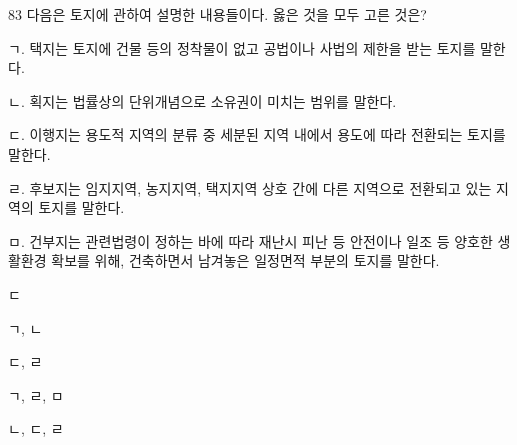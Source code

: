 \begin{question}{83}
다음은 토지에 관하여 설명한 내용들이다. 옳은 것을 모두 고른 것은?
\begin{framedtext}
ㄱ. 택지는 토지에 건물 등의 정착물이 없고 공법이나 사법의 제한을 받는 토지를 말한다. \par
ㄴ. 획지는 법률상의 단위개념으로 소유권이 미치는 범위를 말한다. \par
ㄷ. 이행지는 용도적 지역의 분류 중 세분된 지역 내에서 용도에 따라 전환되는 토지를 말한다. \par
ㄹ. 후보지는 임지지역, 농지지역, 택지지역 상호 간에 다른 지역으로 전환되고 있는 지역의 토지를 말한다. \par
ㅁ. 건부지는 관련법령이 정하는 바에 따라 재난시 피난 등 안전이나 일조 등 양호한 생활환경 확보를 위해, 건축하면서 남겨놓은 일정면적 부분의 토지를 말한다. \par
\end{framedtext}
\begin{choices}
  \item ㄷ
  \item ㄱ, ㄴ
  \item ㄷ, ㄹ
  \item ㄱ, ㄹ, ㅁ
  \item ㄴ, ㄷ, ㄹ
\end{choices}
\end{question}
